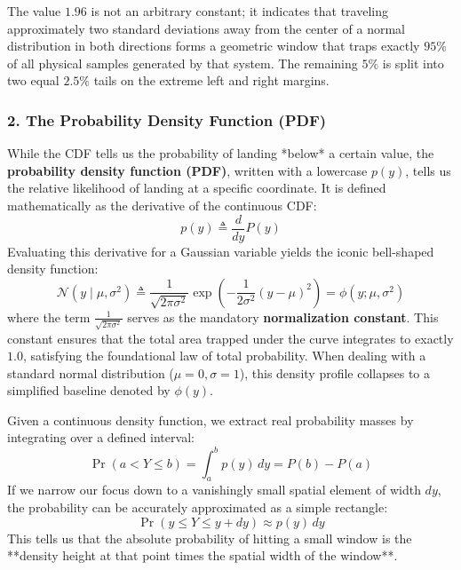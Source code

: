\documentclass{article}
\begin{document}
\begin{tcolorbox}[colback=blue!5!white, colframe=blue!60!black, title=Geometric Intuition: The 95\% Interval]
The value $1.96$ is not an arbitrary constant; it indicates that traveling approximately two standard deviations away from the center of a normal distribution in both directions forms a geometric window that traps exactly $95\%$ of all physical samples generated by that system. The remaining $5\%$ is split into two equal $2.5\%$ tails on the extreme left and right margins.
\end{tcolorbox}

\subsubsection*{2. The Probability Density Function (PDF)}
While the CDF tells us the probability of landing *below* a certain value, the \textbf{probability density function (PDF)}, written with a lowercase $p(y)$, tells us the relative likelihood of landing at a specific coordinate. It is defined mathematically as the derivative of the continuous CDF:
\begin{equation}
    p(y) \triangleq \frac{d}{dy} P(y)
\end{equation}
Evaluating this derivative for a Gaussian variable yields the iconic bell-shaped density function:
\begin{equation}
    \mathcal{N}(y \mid \mu, \sigma^2) \triangleq \frac{1}{\sqrt{2\pi\sigma^2}} \exp\left( -\frac{1}{2\sigma^2}(y - \mu)^2 \right) = \phi(y; \mu, \sigma^2)
\end{equation}
where the term $\frac{1}{\sqrt{2\pi\sigma^2}}$ serves as the mandatory \textbf{normalization constant}. This constant ensures that the total area trapped under the curve integrates to exactly $1.0$, satisfying the foundational law of total probability. When dealing with a standard normal distribution ($\mu=0, \sigma=1$), this density profile collapses to a simplified baseline denoted by $\phi(y)$.

Given a continuous density function, we extract real probability masses by integrating over a defined interval:
\begin{equation}
    \Pr(a < Y \le b) = \int_{a}^{b} p(y) \, dy = P(b) - P(a)
\end{equation}
If we narrow our focus down to a vanishingly small spatial element of width $dy$, the probability can be accurately approximated as a simple rectangle:
\begin{equation}
    \Pr(y \le Y \le y + dy) \approx p(y) \, dy
\end{equation}
This tells us that the absolute probability of hitting a small window is the **density height at that point times the spatial width of the window**.
\end{document}
